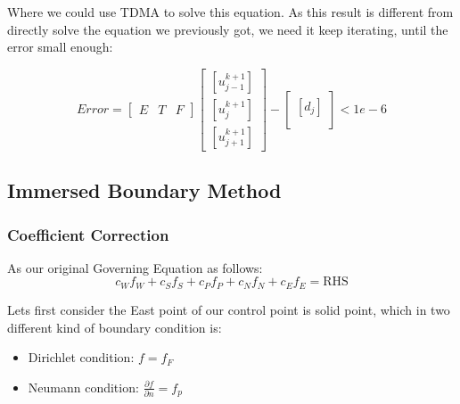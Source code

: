 \documentclass[12pt]{article}
\begin{document}
Where we could use TDMA to solve this equation. As this result is different from directly solve the equation we previously got, we need it keep iterating, until the error small enough:


\[ 
Error = 
\left[
\begin{array}{c|c|c}
E & T & F 
\end{array}
\right]
\begin{bmatrix}
    [u_{j-1}^{k+1}] \\
    [u_{j}^{k+1}] \\
   [ u_{j+1}^{k+1}]
\end{bmatrix}
-
\begin{bmatrix}
    [d_{j}] \\
\end{bmatrix}
<1e-6
\]



\subsection{Immersed Boundary Method}
\subsubsection{Coefficient Correction}



\noindent As our original Governing Equation as follows:
$$
c_W f_W + c_S f_S + c_P f_P + c_N f_N + c_E f_E = \text{RHS}
$$

Lets first consider the East point of our control point is solid point, which in two different kind of boundary condition is: 


\begin{itemize}
    \item  Dirichlet condition: $f = f_F$ \item Neumann condition: $\frac{\partial f}{\partial n} = f_p$
\end{itemize}
\end{document}
